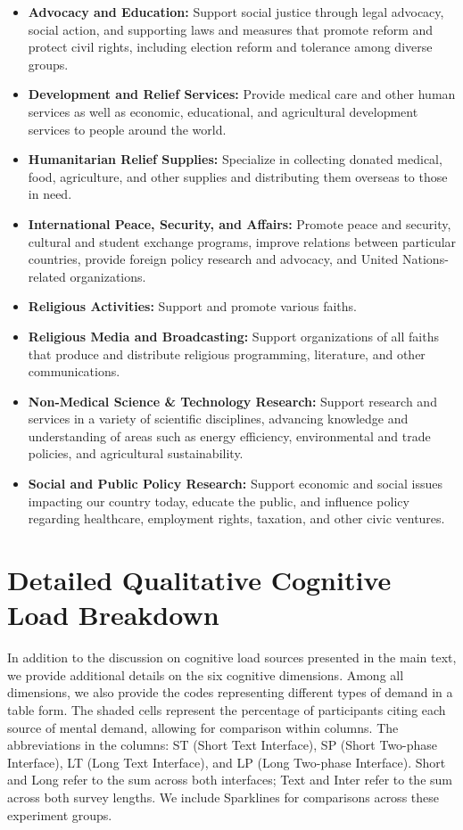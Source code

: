 \begin{itemize}
    \item \textbf{Advocacy and Education:} Support social justice through legal advocacy, social action, and supporting laws and measures that promote reform and protect civil rights, including election reform and tolerance among diverse groups.
    \item \textbf{Development and Relief Services:} Provide medical care and other human services as well as economic, educational, and agricultural development services to people around the world.
    \item \textbf{Humanitarian Relief Supplies:} Specialize in collecting donated medical, food, agriculture, and other supplies and distributing them overseas to those in need.
    \item \textbf{International Peace, Security, and Affairs:} Promote peace and security, cultural and student exchange programs, improve relations between particular countries, provide foreign policy research and advocacy, and United Nations-related organizations.
    \item \textbf{Religious Activities:} Support and promote various faiths.
    \item \textbf{Religious Media and Broadcasting:} Support organizations of all faiths that produce and distribute religious programming, literature, and other communications.
    \item \textbf{Non-Medical Science \& Technology Research:} Support research and services in a variety of scientific disciplines, advancing knowledge and understanding of areas such as energy efficiency, environmental and trade policies, and agricultural sustainability.
    \item \textbf{Social and Public Policy Research:} Support economic and social issues impacting our country today, educate the public, and influence policy regarding healthcare, employment rights, taxation, and other civic ventures.
\end{itemize}

\section{Detailed Qualitative Cognitive Load Breakdown}
\label{apdx:cog_qual}

In addition to the discussion on cognitive load sources presented in the main text, we provide additional details on the six cognitive dimensions. Among all dimensions, we also provide the codes representing different types of demand in a table form. The shaded cells represent the percentage of participants citing each source of mental demand, allowing for comparison within columns. The abbreviations in the columns: ST (Short Text Interface), SP (Short Two-phase Interface), LT (Long Text Interface), and LP (Long Two-phase Interface). Short and Long refer to the sum across both interfaces; Text and Inter refer to the sum across both survey lengths. We include Sparklines for comparisons across these experiment groups.

